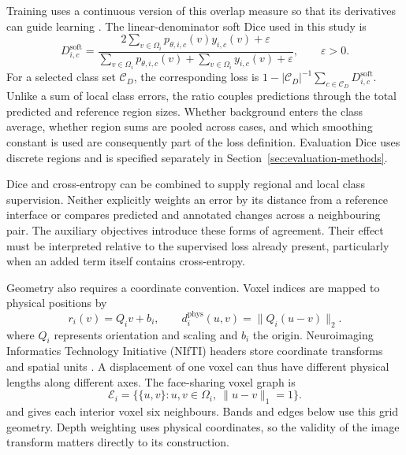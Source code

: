 \documentclass[12pt,a4paper]{article}
\begin{document}
Training uses a continuous version of this overlap measure so that its
derivatives can guide learning \cite{milletari2016vnet}. The
linear-denominator soft Dice used in this study is
\begin{equation}
D_{i,c}^{\mathrm{soft}}=
\frac{2\sum_{v\in\Omega_i}p_{\theta,i,c}(v)y_{i,c}(v)+\varepsilon}
     {\sum_{v\in\Omega_i}p_{\theta,i,c}(v)
      +\sum_{v\in\Omega_i}y_{i,c}(v)+\varepsilon},
\qquad \varepsilon>0.
\label{eq:soft-dice}
\end{equation}
For a selected class set $\mathcal C_D$, the corresponding loss is
$1-|\mathcal C_D|^{-1}\sum_{c\in\mathcal C_D}D^{\mathrm{soft}}_{i,c}$.
Unlike a sum of local class errors, the ratio couples predictions through
the total predicted and reference region sizes. Whether background enters
the class average, whether region sums are pooled across cases, and which
smoothing constant is used are consequently part of the loss definition.
Evaluation Dice uses discrete regions and is specified separately in
Section~\ref{sec:evaluation-methods}.

Dice and cross-entropy can be combined to supply regional and local class
supervision. Neither explicitly weights an error by its distance from a
reference interface or compares predicted and annotated changes across
a neighbouring pair. The auxiliary objectives introduce these forms of
agreement. Their effect must be interpreted relative to the supervised
loss already present, particularly when an added term itself contains
cross-entropy.

Geometry also requires a coordinate convention. Voxel indices are mapped
to physical positions by
\begin{equation}
r_i(v)=Q_i v+b_i,
\qquad
d_i^{\mathrm{phys}}(u,v)=\lVert Q_i(u-v)\rVert_2.
\label{eq:physical-coordinates}
\end{equation}
where $Q_i$ represents orientation and scaling and $b_i$ the origin.
Neuroimaging Informatics Technology Initiative (NIfTI) headers store
coordinate transforms and spatial units
\cite{nifti1fields}. A displacement of one voxel can thus have different
physical lengths along different axes. The face-sharing voxel graph is
\begin{equation}
\mathcal{E}_i=\{\{u,v\}:u,v\in\Omega_i,\ \lVert u-v\rVert_1=1\}.
\label{eq:voxel-neighbourhood}
\end{equation}
and gives each interior voxel six neighbours. Bands and edges below use
this grid geometry. Depth weighting uses physical coordinates, so the
validity of the image transform matters directly to its construction.
\end{document}
